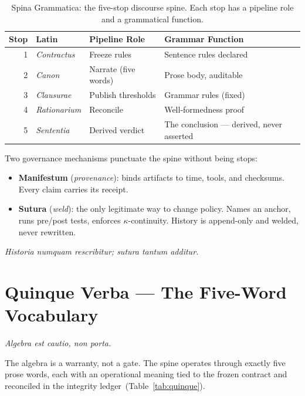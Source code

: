 \documentclass[
  aps,
  prd,
  twocolumn,
  superscriptaddress,
  nofootinbib,
  floatfix
]{revtex4-2}
\newcommand{\Logint}{\kappa}
\newcommand{\lat}[1]{\textit{#1}}
\begin{document}
\begin{table}[htbp]
\centering
\small
\caption{Spina Grammatica: the five-stop discourse spine.
  Each stop has a pipeline role and a grammatical function.}
\label{tab:spina}
\begin{tabular}{@{}rlP{1.5cm}P{1.6cm}@{}}
\toprule
\textbf{Stop} & \textbf{Latin} & \textbf{Pipeline Role} &
  \textbf{Grammar Function} \\
 & \lat{Contractus} & Freeze rules &
  Sentence rules declared \\[3pt]
2 & \lat{Canon} & Narrate (five words) &
  Prose body, auditable \\[3pt]
3 & \lat{Clausurae} & Publish thresholds &
  Grammar rules (fixed) \\[3pt]
4 & \lat{Rationarium} & Reconcile &
  Well-formedness proof \\[3pt]
5 & \lat{Sententia} & Derived verdict &
  The conclusion --- derived, never asserted \\
\bottomrule
\end{tabular}
\end{table}

\noindent
Two governance mechanisms punctuate the spine without being stops:

\begin{itemize}[nosep,leftmargin=*]
\item \textbf{Manifestum} (\lat{provenance}): binds artifacts to
  time, tools, and checksums. Every claim carries its receipt.
\item \textbf{Sutura} (\lat{weld}): the only legitimate way to
  change policy. Names an anchor, runs pre/post tests, enforces
  $\Logint$-continuity. History is append-only and welded, never
  rewritten.
\end{itemize}

\lat{Historia numquam rescribitur; sutura tantum additur.}

\section{Quinque Verba ---
  The Five-Word Vocabulary}\label{sec:quinque-verba}

\lat{Algebra est cautio, non porta.}

\smallskip\noindent
The algebra is a warranty, not a gate. The spine operates through
exactly five prose words, each with an operational meaning tied
to the frozen contract and reconciled in the integrity
ledger~(Table~\ref{tab:quinque}).
\end{document}
